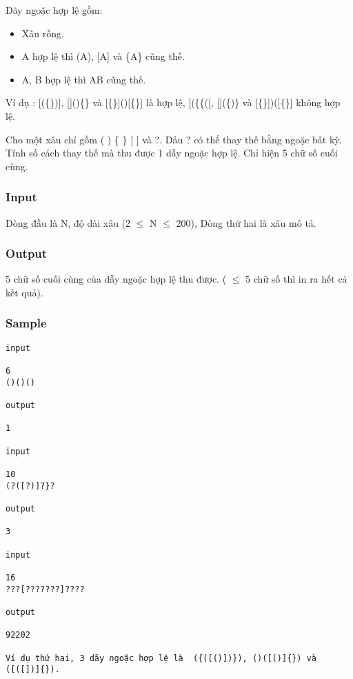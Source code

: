 

Dãy ngoặc hợp lệ gồm:
\begin{itemize}
	\item Xâu rỗng.
	\item A hợp lệ thì (A), [A] và \{A\} cũng thế.
	\item A, B hợp lệ thì AB cũng thế.
\end{itemize}

Ví dụ : [(\{\})], []()\{\} và [\{\}]()[\{\}] là hợp lệ, [(\{\{([, [](\{)\} và [\{\}])([\{\}] không hợp lệ.

Cho một xâu chỉ gồm ( ) \{ \} [ ] và ?. Dấu ? có thể thay thế bằng ngoặc bất kỳ. Tính số cách thay thế mà thu được 1 dẫy ngoặc hợp lệ. Chỉ hiện 5 chữ số cuối cùng.

\subsubsection{Input}

Dòng đầu là N, độ dài xâu (2  $\le$  N  $\le$  200), Dòng thứ hai là xâu mô tả.

\subsubsection{Output}

5 chữ số cuối cùng của dẫy ngoặc hợp lệ thu được. ( $\le$  5 chữ số thì in ra hết cả kết quả).

\subsubsection{Sample}
\begin{verbatim}
input 

6 
()()() 
 
output 
 
1 

input 
 
10 
(?([?)]?}? 
 
output 
 
3

input 
 
16 
???[???????]???? 
 
output 
 
92202

Ví dụ thứ hai, 3 dãy ngoặc hợp lệ là  ({([()])}), ()([()]{}) và ([([])]{}).
\end{verbatim}
